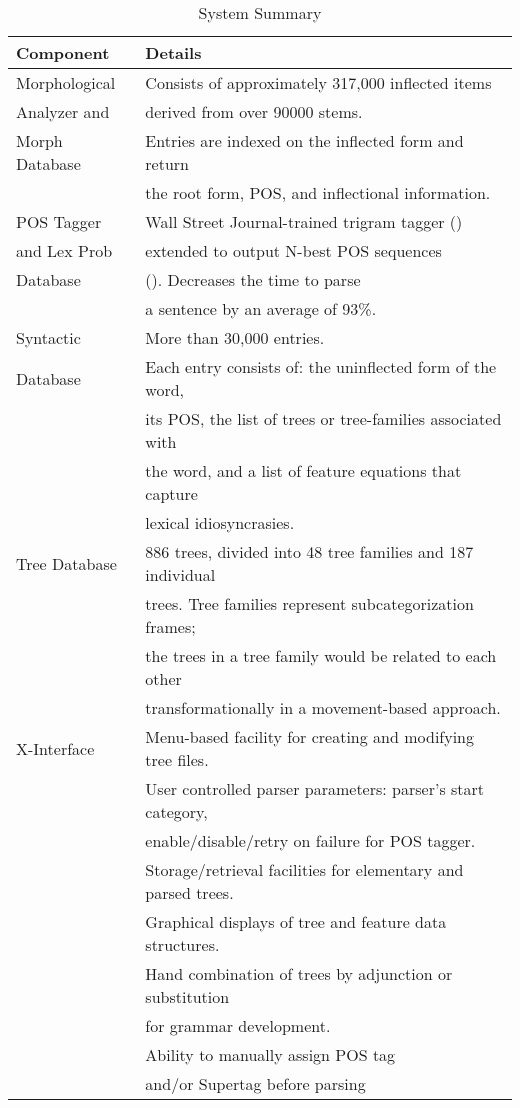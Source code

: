 \begin{table}[ht]
\small
\centering
\begin{tabular}{|l|l|} \hline
Component & Details \\ \hline
Morphological & Consists of approximately 317,000 inflected items \\ 
Analyzer and & derived from over 90000 stems. \\ 
Morph Database & Entries are indexed on the inflected form and return \\
& the root form, POS, and inflectional information.\\ \hline
POS Tagger & Wall Street Journal-trained
trigram tagger (\cite{kwc88})  \\ 
and  Lex Prob & extended to output N-best POS sequences  \\
Database & (\cite{soong90}). Decreases the time to parse \\
&a sentence by an average of 93\%. \\\hline
Syntactic &  More than 30,000 entries. \\
Database & Each entry consists of: the uninflected form of the word, \\
& its POS, the list of trees or tree-families associated with \\
& the word, and a list of feature equations that capture \\
&lexical idiosyncrasies. \\ \hline
Tree Database &  886 trees, divided into 48 tree families and 187 individual \\
& trees. Tree families represent subcategorization frames; \\
& the trees in a tree family would be related to each other \\

& transformationally in a movement-based approach. \\ \hline
X-Interface & Menu-based facility for creating and modifying tree files. \\
&  User controlled parser parameters: parser's start category, \\ 
& enable/disable/retry on failure for POS tagger. \\
& Storage/retrieval facilities for elementary and parsed trees.\\
& Graphical displays of tree and feature data structures. \\
& Hand combination of trees by adjunction or substitution \\
& for grammar development. \\ 
& Ability to manually assign POS tag \\
& and/or Supertag before parsing \\ \hline
\end{tabular}
\caption{System Summary}
\label{sys-table}
\end{table}

